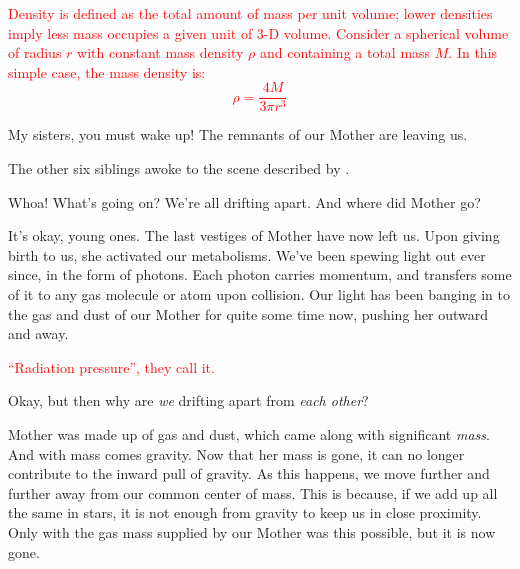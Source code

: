 \documentclass[main.tex]{subfiles}
\begin{document}
\begin{tcolorbox}[sharp corners, colback=red!30, colframe=red!80!blue, title=Mass Density]
\par \textcolor{red} {\nar Density is defined as the total amount of mass per unit volume; lower densities imply less mass occupies a given unit of 3-D volume.  Consider a spherical volume of radius $r$ with constant mass density $\rho$ and containing a total mass $M$.  In this simple case, the mass density is:
\begin{equation}
\rho = \frac{4M}{3{\pi}r^3}
\end{equation}
}  
\end{tcolorbox}

\par \Sterope My sisters, you must wake up!  The remnants of our Mother are leaving us.

\par \nar The other six siblings awoke to the scene described by \rmsterope.  

\par \Electra Whoa!  What's going on?  We're all drifting apart.  And where did Mother go?

\par \Maia It's okay, young ones.  The last vestiges of Mother have now left us.  Upon giving birth to us, she activated our metabolisms.  We've been spewing light out ever since, in the form of photons.  Each photon carries momentum, and transfers some of it to any gas molecule or atom upon collision.  Our light has been banging in to the gas and dust of our Mother for quite some time now, pushing her outward and away.

\begin{tcolorbox}[sharp corners, colback=red!30, colframe=red!80!blue, title=Momentum Carried by Light]
\par \textcolor{red} {``Radiation pressure'', they call it.}
\end{tcolorbox}

\par \Electra Okay, but then why are \textit{we} drifting apart from \textit{each other}?

\par \Maia Mother was made up of gas and dust, which came along with significant \textit{mass}.  And with mass comes gravity.  Now that her mass is gone, it can no longer contribute to the inward pull of gravity.  As this happens, we move further and further away from our common center of mass. This is because, if we add up all the same in stars, it is not enough from gravity to keep us in close proximity.  Only with the gas mass supplied by our Mother was this possible, but it is now gone.
\end{document}
